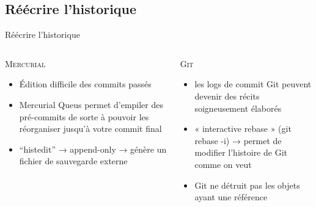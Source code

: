 \subsection{Réécrire l'historique}
\begin{frame}{Réécrire l'historique}
  \begin{columns}[T]

    \begin{column}{.5\textwidth}
     \textsc{Mercurial}

      \begin{itemize}
        \item{Édition difficile des commits passés}
        \item{Mercurial Queus permet d’empiler des pré-commits de sorte à
              pouvoir les réorganiser jusqu’à votre commit final}
        \item{“histedit” → append-only → génère un fichier de sauvegarde externe}
      \end{itemize}
    \end{column}

    \begin{column}{.5\textwidth}
      \textsc{Git}

      \begin{itemize}
        \item{les logs de commit Git peuvent devenir des récits soigneusement
              élaborés}
        \item{« interactive rebase » (git rebase -i) → permet de modifier
              l’histoire de Git comme on veut}
        \item{Git ne détruit pas les objets ayant une référence}
      \end{itemize}
    \end{column}

  \end{columns}
\end{frame}

